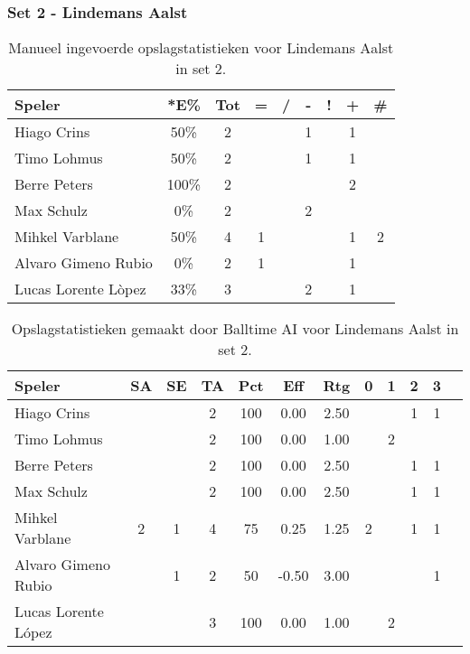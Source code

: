 \subsubsection{Set 2 - Lindemans Aalst}
\label{sec:PL3_Aalst2}


\begin{table}[ht!]
    \centering
    \scriptsize
    \begin{tabular}{|l|c|c|c|c|c|c|c|c|}
        \hline
        \textbf{Speler} & *E\% & Tot & = & / & - & ! & + & \# \\ \hline
        Hiago Crins & 50\% & 2 &  &  & 1 &  & 1 &  \\
        Timo Lohmus & 50\% & 2 &  &  & 1 &  & 1 & \\ 
        Berre Peters & 100\% & 2 &  &  &  &  & 2 &\\ 
        Max Schulz & 0\% & 2 &  &  & 2 &  &  & \\ 
        Mihkel Varblane & 50\% & 4 & 1 &  &  & & 1 & 2 \\ 
        Alvaro Gimeno Rubio & 0\% & 2 & 1 &  &  &  & 1 &  \\ 
        Lucas Lorente Lòpez & 33\% & 3 &  &  & 2 &  & 1 & \\ \hline
    \end{tabular}
   \caption[Manueel ingevoerde opslagstatistieken voor Lindemans Aalst in set 2]{\label{tab:PL3ServeAalstMan2}Manueel ingevoerde opslagstatistieken voor Lindemans Aalst in set 2.}
\end{table}

\begin{table}[ht!]
  \centering
  \scriptsize
  \begin{tabular}{|l|c|c|c|c|c|c|c|c|c|c|c|} \hline
    \textbf{Speler} & SA & SE & TA & Pct & Eff & Rtg & 0 & 1 & 2 & 3  \\ \hline
    Hiago Crins &  &  & 2 & 100 & 0.00 & 2.50 &   &  & 1 & 1  \\
    Timo Lohmus &  &  & 2 & 100 & 0.00 & 1.00 &   & 2 &   &  \\
    Berre Peters &  &  & 2 & 100 & 0.00 & 2.50 &   &  & 1 & 1 \\
    Max Schulz &  &  & 2 & 100 & 0.00 & 2.50 &   &  & 1 & 1 \\
    Mihkel Varblane & 2 & 1 & 4 & 75 & 0.25 & 1.25 & 2 &   & 1 & 1 \\
    Alvaro Gimeno Rubio & & 1 & 2 & 50 & -0.50 & 3.00 &   &  & & 1 \\ 
    Lucas Lorente López &  &  & 3 & 100 & 0.00 & 1.00 &   & 2 &   & \\  \hline
  \end{tabular}
  \caption[Opslagstatistieken gemaakt door Balltime AI voor Lindemans Aalst in set 2]{\label{tab:PL3ServeAalstAI2}Opslagstatistieken gemaakt door Balltime AI voor Lindemans Aalst in set 2.}
\end{table}

